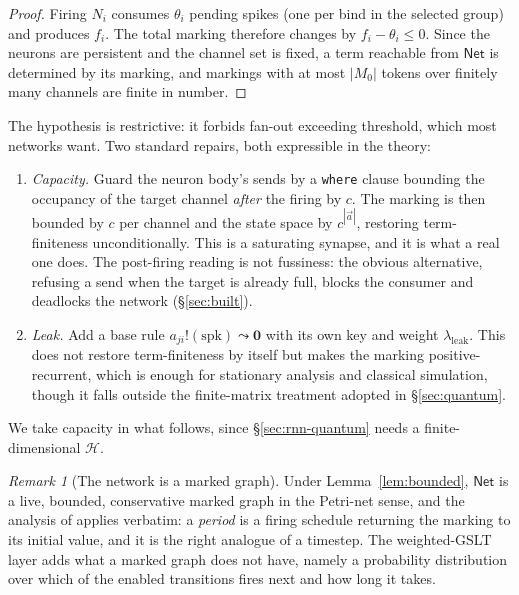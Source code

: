 \documentclass[11pt,a4paper]{article}
\theoremstyle{plain}
\theoremstyle{definition}
\theoremstyle{remark}
\newtheorem{remark}[theorem]{Remark}
\newcommand{\Nil}{\mathbf{0}}
\begin{document}
\begin{proof}
Firing $N_i$ consumes $\theta_i$ pending spikes (one per bind in the selected group) and produces
$f_i$. The total marking therefore changes by $f_i - \theta_i \leq 0$. Since the neurons are
persistent and the channel set is fixed, a term reachable from $\mathsf{Net}$ is determined by its
marking, and markings with at most $|M_0|$ tokens over finitely many channels are finite in number.
\end{proof}

The hypothesis is restrictive: it forbids fan-out exceeding threshold, which most networks want. Two
standard repairs, both expressible in the theory:

\begin{enumerate}[leftmargin=2.2em]
\item \emph{Capacity.} Guard the neuron body's sends by a \texttt{where} clause bounding the
occupancy of the target channel \emph{after} the firing by $c$. The marking is then bounded by $c$
per channel and the state space by $c^{|\vec a|}$, restoring term-finiteness unconditionally. This is
a saturating synapse, and it is what a real one does. The post-firing reading is not fussiness: the
obvious alternative, refusing a send when the target is already full, blocks the consumer and
deadlocks the network (\S\ref{sec:built}).
\item \emph{Leak.} Add a base rule $a_{ji}!(\mathrm{spk}) \leadsto \Nil$ with its own key and weight
$\lambda_{\text{leak}}$. This does not restore term-finiteness by itself but makes the marking
positive-recurrent, which is enough for stationary analysis and classical simulation, though it falls
outside the finite-matrix treatment adopted in \S\ref{sec:quantum}.
\end{enumerate}

We take capacity in what follows, since \S\ref{sec:rnn-quantum} needs a finite-dimensional
$\mathcal{H}$.

\begin{remark}[The network is a marked graph]
Under Lemma~\ref{lem:bounded}, $\mathsf{Net}$ is a live, bounded, conservative marked graph in the
Petri-net sense, and the analysis of \cite{knots} applies verbatim: a \emph{period} is a firing
schedule returning the marking to its initial value, and it is the right analogue of a timestep. The
weighted-GSLT layer adds what a marked graph does not have, namely a probability distribution over
which of the enabled transitions fires next and how long it takes.
\end{remark}
\end{document}
